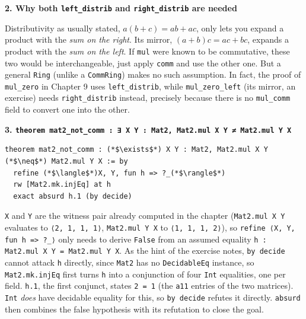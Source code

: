 \textbf{2. Why both \texttt{left\_\allowbreak{}distrib} and \texttt{right\_\allowbreak{}distrib} are needed}

Distributivity as usually stated, \(a(b+c) = ab+ac\), only lets you expand a product with the \emph{sum on the right}. Its mirror, \((a+b)c = ac+bc\), expands a product with the \emph{sum on the left}. If \texttt{mul} were known to be commutative, these two would be interchangeable, just apply \texttt{comm} and use the other one. But a general \texttt{Ring} (unlike a \texttt{CommRing}) makes no such assumption. In fact, the proof of \texttt{mul\_\allowbreak{}zero} in Chapter 9 uses \texttt{left\_\allowbreak{}distrib}, while \texttt{mul\_\allowbreak{}zero\_\allowbreak{}left} (its mirror, an exercise) needs \texttt{right\_\allowbreak{}distrib} instead, precisely because there is no \texttt{mul\_\allowbreak{}comm} field to convert one into the other.

\textbf{3. \texttt{theorem mat2\_\allowbreak{}not\_\allowbreak{}comm : ∃ X Y : Mat2, Mat2.mul X Y ≠ Mat2.mul Y X}}

\begin{lstlisting}
theorem mat2_not_comm : (*$\exists$*) X Y : Mat2, Mat2.mul X Y (*$\neq$*) Mat2.mul Y X := by
  refine (*$\langle$*)X, Y, fun h => ?_(*$\rangle$*)
  rw [Mat2.mk.injEq] at h
  exact absurd h.1 (by decide)
\end{lstlisting}

\texttt{X} and \texttt{Y} are the witness pair already computed in the chapter (\texttt{Mat2.mul X Y} evaluates to \texttt{⟨2, 1, 1, 1⟩}, \texttt{Mat2.mul Y X} to \texttt{⟨1, 1, 1, 2⟩}), so \texttt{refine ⟨X, Y, fun h => ?\_\allowbreak{}⟩} only needs to derive \texttt{False} from an assumed equality \texttt{h : Mat2.mul X Y = Mat2.mul Y X}. As the hint of the exercise notes, \texttt{by decide} cannot attack \texttt{h} directly, since \texttt{Mat2} has no \texttt{DecidableEq} instance, so \texttt{Mat2.mk.injEq} first turns \texttt{h} into a conjunction of four \texttt{Int} equalities, one per field. \texttt{h.1}, the first conjunct, states \texttt{2 = 1} (the \texttt{a11} entries of the two matrices). \texttt{Int} \emph{does} have decidable equality for this, so \texttt{by decide} refutes it directly. \texttt{absurd} then combines the false hypothesis with its refutation to close the goal.
